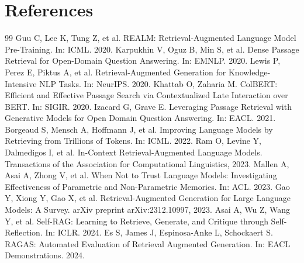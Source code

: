 \documentclass[10.5pt,compsoc]{CjC}
\begin{document}
\section*{References}

\begin{thebibliography}{99}
 Guu C, Lee K, Tung Z, et al. REALM: Retrieval-Augmented Language Model Pre-Training. In: ICML. 2020.
 Karpukhin V, Oguz B, Min S, et al. Dense Passage Retrieval for Open-Domain Question Answering. In: EMNLP. 2020.
 Lewis P, Perez E, Piktus A, et al. Retrieval-Augmented Generation for Knowledge-Intensive NLP Tasks. In: NeurIPS. 2020.
 Khattab O, Zaharia M. ColBERT: Efficient and Effective Passage Search via Contextualized Late Interaction over BERT. In: SIGIR. 2020.
 Izacard G, Grave E. Leveraging Passage Retrieval with Generative Models for Open Domain Question Answering. In: EACL. 2021.
 Borgeaud S, Mensch A, Hoffmann J, et al. Improving Language Models by Retrieving from Trillions of Tokens. In: ICML. 2022.
 Ram O, Levine Y, Dalmedigos I, et al. In-Context Retrieval-Augmented Language Models. Transactions of the Association for Computational Linguistics, 2023.
 Mallen A, Asai A, Zhong V, et al. When Not to Trust Language Models: Investigating Effectiveness of Parametric and Non-Parametric Memories. In: ACL. 2023.
 Gao Y, Xiong Y, Gao X, et al. Retrieval-Augmented Generation for Large Language Models: A Survey. arXiv preprint arXiv:2312.10997, 2023.
 Asai A, Wu Z, Wang Y, et al. Self-RAG: Learning to Retrieve, Generate, and Critique through Self-Reflection. In: ICLR. 2024.
 Es S, James J, Espinosa-Anke L, Schockaert S. RAGAS: Automated Evaluation of Retrieval Augmented Generation. In: EACL Demonstrations. 2024.
\end{thebibliography}
\end{document}

